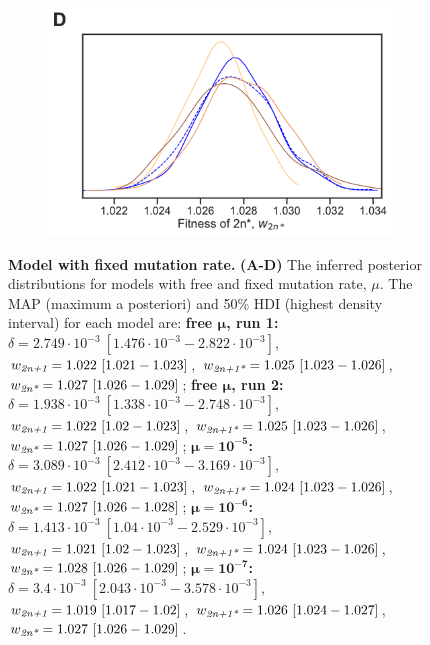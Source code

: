 \documentclass[12pt]{extarticle}
\newcommand{\anwt}{\emph{2n+1}}
\newcommand{\eumt}{\emph{2n*}}
\newcommand{\anmt}{\emph{2n+1*}}
\begin{document}
\begin{figure}[p]
\begin{subfigure}{0.45\textwidth}
  \end{subfigure}
    \begin{subfigure}{0.45\textwidth}
      \includegraphics[width=\textwidth]{../figures/mu-D.pdf}      
    \end{subfigure}
  \caption{
    \textbf{Model with fixed mutation rate.}  \textbf{(A-D)} The inferred posterior distributions for models with free and fixed mutation rate, $\mu$. The MAP (maximum a posteriori) and 50\% HDI (highest density interval) for each model are: 
\textbf{free $\boldsymbol{\mu}$, run 1:}
$\delta=2.749\cdot10^{-3}\ [1.476\cdot10^{-3}-2.822\cdot10^{-3}]$,
$w_{\anwt}=1.022\ [1.021-1.023]$,
$w_{\anmt}=1.025\ [1.023-1.026]$,
$w_{\eumt}=1.027\ [1.026-1.029]$;
\textbf{free $\boldsymbol{\mu}$, run 2:}
$\delta=1.938\cdot10^{-3}\ [1.338\cdot10^{-3}-2.748\cdot10^{-3}]$,
$w_{\anwt}=1.022\ [1.02-1.023]$,
$w_{\anmt}=1.025\ [1.023-1.026]$,
$w_{\eumt}=1.027\ [1.026-1.029]$;
\textbf{$\boldsymbol{\mu=10^{-5}}$:}
$\delta=3.089\cdot10^{-3}\ [2.412\cdot10^{-3}-3.169\cdot10^{-3}]$,
$w_{\anwt}=1.022\ [1.021-1.023]$,
$w_{\anmt}=1.024\ [1.023-1.026]$,
$w_{\eumt}=1.027\ [1.026-1.028]$;
\textbf{$\boldsymbol{\mu=10^{-6}}$:}
$\delta=1.413\cdot10^{-3}\ [1.04\cdot10^{-3}-2.529\cdot10^{-3}]$,
$w_{\anwt}=1.021\ [1.02-1.023]$,
$w_{\anmt}=1.024\ [1.023-1.026]$,
$w_{\eumt}=1.028\ [1.026-1.029]$;
\textbf{$\boldsymbol{\mu=10^{-7}}$:}
$\delta=3.4\cdot10^{-3}\ [2.043\cdot10^{-3}-3.578\cdot10^{-3}]$,
$w_{\anwt}=1.019\ [1.017-1.02]$,
$w_{\anmt}=1.026\ [1.024-1.027]$,
$w_{\eumt}=1.027\ [1.026-1.029]$.
\label{fig:mu}
  }
\end{figure}
\end{document}
